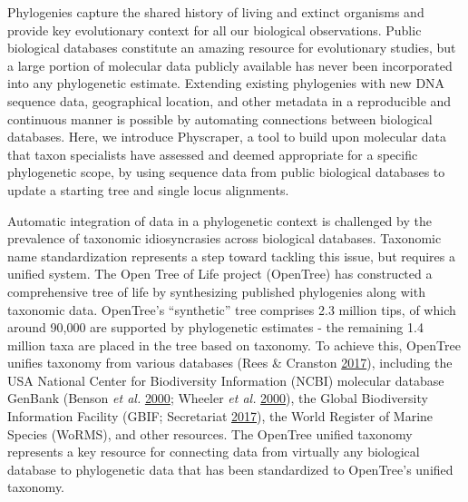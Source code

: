 \documentclass[]{article}
\begin{document}
Phylogenies capture the shared history of living and extinct organisms and provide key evolutionary context for all our biological observations.
Public biological databases constitute an amazing resource for evolutionary studies, but a large portion of molecular data publicly available has never been incorporated into any phylogenetic estimate. Extending existing phylogenies with new DNA sequence data, geographical location, and other metadata in a reproducible and continuous manner is possible by automating connections between biological databases. Here, we introduce Physcraper, a tool to build upon molecular data that taxon specialists have assessed and deemed appropriate for a specific phylogenetic scope, by using sequence data from public biological databases to update a starting tree and single locus alignments.

Automatic integration of data in a phylogenetic context is challenged by the prevalence of taxonomic idiosyncrasies across biological databases. Taxonomic name standardization represents a step toward tackling this issue, but requires a unified system. The Open Tree of Life project (OpenTree)
has constructed a comprehensive tree of life by synthesizing published phylogenies along with taxonomic data. OpenTree's ``synthetic'' tree comprises 2.3 million tips, of which around 90,000 are supported by phylogenetic estimates - the remaining 1.4 million taxa are placed in the tree based on taxonomy. To achieve this, OpenTree unifies taxonomy from various databases (Rees \& Cranston \protect\hyperlink{ref-rees2017automated}{2017}), including the USA National Center for Biodiversity Information (NCBI) molecular database GenBank (Benson \emph{et al.} \protect\hyperlink{ref-benson2000genbank}{2000}; Wheeler \emph{et al.} \protect\hyperlink{ref-wheeler2000database}{2000}), the Global Biodiversity Information Facility (GBIF; Secretariat \protect\hyperlink{ref-secretariat2017gbif}{2017}), the World Register of Marine Species (WoRMS), and other resources. The OpenTree unified taxonomy represents a key resource for connecting data from virtually any biological database to phylogenetic data that has been standardized to OpenTree's unified taxonomy.
\end{document}

